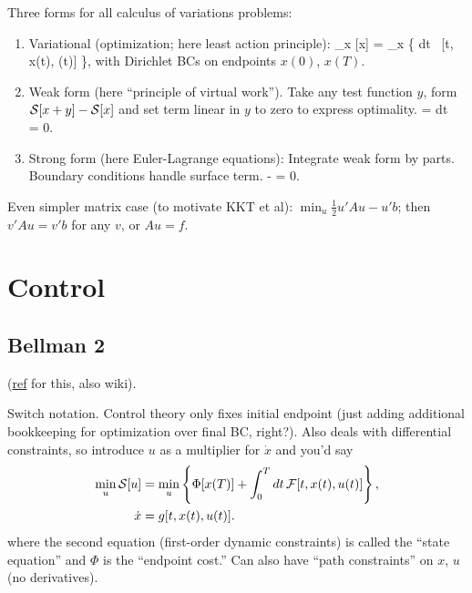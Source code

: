 \documentclass[notitlepage,openany,11pt]{report}
\theoremstyle{plain}%
\numberwithin{equation}{section}
\begin{document}
Three forms for all calculus of variations problems:
\begin{enumerate}
\item Variational (optimization; here least action principle):
\be
\min_{x} [x] = \min_{x} \left\{ \int \! dt \, [t, x(t), (t)] \right\},
\ee with Dirichlet BCs on endpoints $x(0)$, $x(T)$. 
\item Weak form (here ``principle of virtual work''). Take any test function $y$, form $\mathcal{S}[x+y] - \mathcal{S}[x]$ and set term linear in $y$ to zero to express optimality. 
\be
\delta {} = \int dt \, = 0.
\ee
\item Strong form (here Euler-Lagrange equations): Integrate weak form by parts. Boundary conditions handle surface term.
\be
{} -   = 0.
\ee
\end{enumerate}
Even simpler matrix case (to motivate KKT et al): $\min_{u} \tfrac{1}{2} u' A u - u' b$; then $v' A u = v' b$ for any $v$, or $Au = f$.


\section{Control}

\subsection{Bellman 2}
(\href{https://math.stackexchange.com/questions/782621/difference-between-variation-of-calculus-problems-and-control-theory-problems}{ref} for this, also wiki). 

Switch notation. Control theory only fixes initial endpoint (just adding additional bookkeeping for optimization over final BC, right?). Also deals with differential constraints, so introduce $u$ as a multiplier for $\dot{x}$ and you'd say
\begin{align*}
\min_{u} \mathcal{S}[u] &= \min_{u}\left\{ \Phi[x(T)] + \int_{0}^{T} dt \, \mathcal{F}[t, x(t), u(t)] \right\}, \\
\dot{x} &= g[t, x(t), u(t)].
\end{align*}
where the second equation (first-order dynamic constraints) is called the ``state equation'' and $\Phi$ is the ``endpoint cost.'' Can also have ``path constraints'' on $x$, $u$ (no derivatives).
\end{document}
